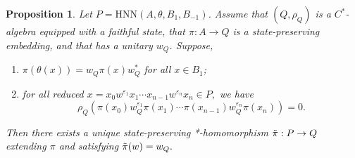 \documentclass[10pt,a4paper]{amsart}
\newtheorem{proposition}{Proposition}
\begin{document}
\begin{proposition}\label{prop: hnn-univ-prop}
    Let $P = \mathrm{HNN}(A,\theta,B_1,B_{-1})$. Assume that $(Q,\rho_Q)$ is a $C^\ast$-algebra equipped with a faithful state, that $\pi: A \to Q$ is a state-preserving embedding, and that has a unitary $w_Q$. Suppose,
    \begin{enumerate}
        \item $\pi(\theta(x)) = w_Q\pi(x)w_Q^\ast$ for all $x\in B_1$;
        \item for all reduced $x = x_0w^{\varepsilon_1}x_1\cdots x_{n-1}w^{\varepsilon_n}x_n \in P,$ we have
        \begin{equation*}
            \rho_Q(\pi(x_0)w_Q^{\varepsilon_1}\pi(x_1)\cdots \pi(x_{n-1})w_Q^{\varepsilon_n}\pi(x_n)) = 0.
        \end{equation*}
    \end{enumerate}
    Then there exists a unique state-preserving *-homomorphism $\Tilde{\pi}:P\to Q$ extending $\pi$ and satisfying $\Tilde{\pi}(w) = w_Q.$
\end{proposition}
\end{document}
